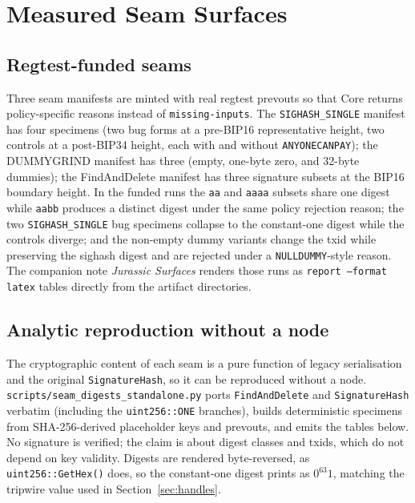 \documentclass[11pt]{article}
\begin{document}
\section{Measured Seam Surfaces}
\label{sec:measured}

\subsection{Regtest-funded seams}

Three seam manifests are minted with real regtest prevouts so that Core returns
policy-specific reasons instead of \texttt{missing-inputs}. The
\texttt{SIGHASH\_SINGLE} manifest has four specimens (two bug forms at a
pre-BIP16 representative height, two controls at a post-BIP34 height, each with
and without \texttt{ANYONECANPAY}); the DUMMYGRIND manifest has three (empty,
one-byte zero, and 32-byte dummies); the FindAndDelete manifest has three
signature subsets at the BIP16 boundary height. In the funded runs the
\texttt{aa} and \texttt{aaaa} subsets share one digest while \texttt{aabb}
produces a distinct digest under the same policy rejection reason; the two
\texttt{SIGHASH\_SINGLE} bug specimens collapse to the constant-one digest while
the controls diverge; and the non-empty dummy variants change the txid while
preserving the sighash digest and are rejected under a \texttt{NULLDUMMY}-style
reason. The companion note \emph{Jurassic Surfaces} renders those runs as
\texttt{report --format latex} tables directly from the artifact directories.

\subsection{Analytic reproduction without a node}

The cryptographic content of each seam is a pure function of legacy
serialisation and the original \texttt{SignatureHash}, so it can be reproduced
without a node. \texttt{scripts/seam\_digests\_standalone.py} ports
\texttt{FindAndDelete} and \texttt{SignatureHash} verbatim (including the
\texttt{uint256::ONE} branches), builds deterministic specimens from
SHA-256-derived placeholder keys and prevouts, and emits the tables below. No
signature is verified; the claim is about digest classes and txids, which do
not depend on key validity. Digests are rendered byte-reversed, as
\texttt{uint256::GetHex()} does, so the constant-one digest prints as
$0^{63}1$, matching the tripwire value used in Section~\ref{sec:handles}.
\end{document}
